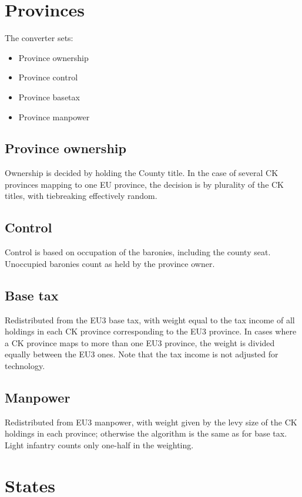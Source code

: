 \documentclass[12pt,ebook,oneside]{book}
\begin{document}
\chapter{Provinces}
The converter sets:
\begin{itemize}
\item Province ownership
\item Province control
\item Province basetax
\item Province manpower  
\end{itemize}

\section{Province ownership}

Ownership is decided by holding the County title. In the case
of several CK provinces mapping to one EU province, the decision
is by plurality of the CK titles, with tiebreaking effectively
random.

\section{Control}

Control is based on occupation of the baronies, including the
county seat. Unoccupied baronies count as held by the province 
owner. 

\section{Base tax}

Redistributed from the EU3 base tax, with weight equal to
the tax income of all holdings in each CK province corresponding
to the EU3 province. In cases where a CK province maps to more
than one EU3 province, the weight is divided equally between the
EU3 ones. Note that the tax income is not adjusted for technology. 

\section{Manpower}

Redistributed from EU3 manpower, with weight given by the levy
size of the CK holdings in each province; otherwise the algorithm
is the same as for base tax. Light infantry counts only
one-half in the weighting. 

\chapter{States}
\end{document}
